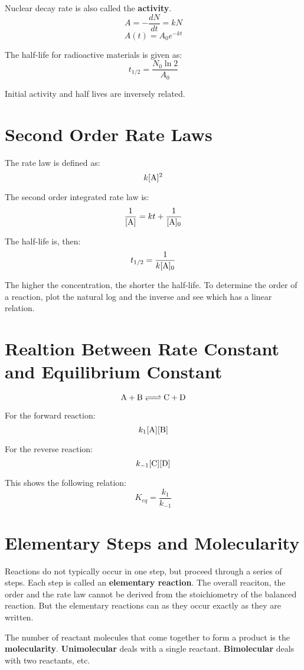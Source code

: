 \documentclass{article}
\begin{document}
Nuclear decay rate is also called the \textbf{activity}. 
$$ A = -\frac{ dN }{ dt } = kN $$
$$ A( t ) = A_{0}e^{-kt} $$

The half-life for radioactive materials is given as:
$$ t_{1/2} = \frac{ N_{0} \ln 2 }{ A_{0} } $$

Initial activity and half lives are inversely related. 

\section{ Second Order Rate Laws }

The rate law is defined as:
$$ k[ \ce{ A } ]^{2} $$

The second order integrated rate law is:
$$ \frac{ 1 }{ [ \ce{ A } ] } = kt + \frac{ 1 }{ [ \ce{ A } ]_{0} } $$

The half-life is, then:
$$ t_{1/2} = \frac{ 1 }{ k [ \ce{ A } ]_{0} } $$

The higher the concentration, the shorter the half-life. To determine the order
of a reaction, plot the natural log and the inverse and see which has a linear
relation.

\section{ Realtion Between Rate Constant and Equilibrium Constant }

$$ \ce{ A + B <=> C + D } $$

For the forward reaction:
$$ k_{1} [ \ce{ A } ] [ \ce{ B } ] $$

For the reverse reaction:
$$ k_{-1} [ \ce{ C } ] [ \ce{ D } ]$$

This shows the following relation:
$$ K_{eq} = \frac{ k_{1} }{ k_{-1} } $$

\section{ Elementary Steps and Molecularity }

Reactions do not typically occur in one step, but proceed through a series of
steps. Each step is called an \textbf{elementary reaction}. The overall
reaciton, the order and the rate law cannot be derived from the stoichiometry of
the balanced reaction. But the elementary reactions can as they occur exactly as
they are written. 

The number of reactant molecules that come together to form a product is the
\textbf{molecularity}. \textbf{Unimolecular} deals with a single reactant.
\textbf{Bimolecular} deals with two reactants, etc.
\end{document}
